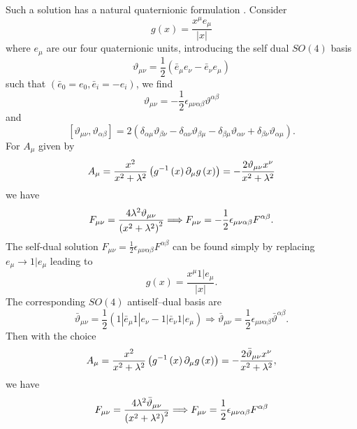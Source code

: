 \documentclass[a4paper,12pt]{book}
\begin{document}
Such a solution has a natural quaternionic formulation \cite{nash}\cite{adhm}%
. Consider 
\begin{equation}
g\left( x\right) =\frac{x^{\mu }e_{\mu }}{\left| x\right| }
\end{equation}
where $e_{\mu }$ are our four quaternionic units, introducing the self dual $%
SO\left( 4\right) $ basis 
\begin{equation}
\vartheta _{\mu \nu }=\frac{1}{2}\left( \bar{e}_{\mu }e_{\nu }-\bar{e}_{\nu
}e_{\mu }\right)
\end{equation}
such that $\left( \bar{e}_{0}=e_{0},\bar{e}_{i}=-e_{i}\right) $, we find 
\begin{equation}
\vartheta _{\mu \nu }=-\frac{1}{2}\epsilon _{\mu \nu \alpha \beta }\vartheta
^{\alpha \beta }
\end{equation}
and 
\begin{equation}
\left[ \vartheta _{\mu \nu },\vartheta _{\alpha \beta }\right] =2\left(
\delta _{\alpha \mu }\vartheta _{\beta \nu }-\delta _{\alpha \nu }\vartheta
_{\beta \mu }-\delta _{\beta \mu }\vartheta _{\alpha \nu }+\delta _{\beta
\nu }\vartheta _{\alpha \mu }\right) .
\end{equation}
For $A_{\mu }$ given by 
\begin{equation}
A_{\mu }=\frac{x^{2}}{x^{2}+\lambda ^{2}}\left( g^{-1}\left( x\right)
\partial _{\mu }g\left( x\right) \right) =-\frac{2\Bbb{\vartheta }_{\mu \nu
}x^{\nu }}{x^{2}+\lambda ^{2}}
\end{equation}
we have 
\begin{equation}
F_{\mu \nu }=\frac{4\lambda ^{2}\Bbb{\vartheta }_{\mu \nu }}{\left(
x^{2}+\lambda ^{2}\right) ^{2}}\Longrightarrow F_{\mu \nu }=-\frac{1}{2}%
\epsilon _{\mu \nu \alpha \beta }F^{\alpha \beta }.
\end{equation}
The self-dual solution $F_{\mu \nu }=\frac{1}{2}\epsilon _{\mu \nu \alpha
\beta }F^{\alpha \beta }$ can be found simply by replacing $e_{\mu
}\rightarrow 1|e_{\mu }$ leading to 
\begin{equation}
g\left( x\right) =\frac{x^{\mu }1|e_{\mu }}{\left| x\right| }.
\end{equation}
The corresponding $SO\left( 4\right) $ antiself--dual basis are 
\begin{equation}
\bar{\vartheta}_{\mu \nu }=\frac{1}{2}\left( 1|\bar{e}_{\mu }1|e_{\nu }-1|%
\bar{e}_{\nu }1|e_{\mu }\right) \Longrightarrow \bar{\vartheta}_{\mu \nu }=%
\frac{1}{2}\epsilon _{\mu \nu \alpha \beta }\bar{\vartheta}^{\alpha \beta }.
\end{equation}
Then with the choice 
\begin{equation}
A_{\mu }=\frac{x^{2}}{x^{2}+\lambda ^{2}}\left( g^{-1}\left( x\right)
\partial _{\mu }g\left( x\right) \right) =-\frac{2\bar{\Bbb{\vartheta }}%
_{\mu \nu }x^{\nu }}{x^{2}+\lambda ^{2}},
\end{equation}
we have 
\begin{equation}
F_{\mu \nu }=\frac{4\lambda ^{2}\bar{\Bbb{\vartheta }}_{\mu \nu }}{\left(
x^{2}+\lambda ^{2}\right) ^{2}}\Longrightarrow F_{\mu \nu }=\frac{1}{2}%
\epsilon _{\mu \nu \alpha \beta }F^{\alpha \beta }
\end{equation}
\end{document}

